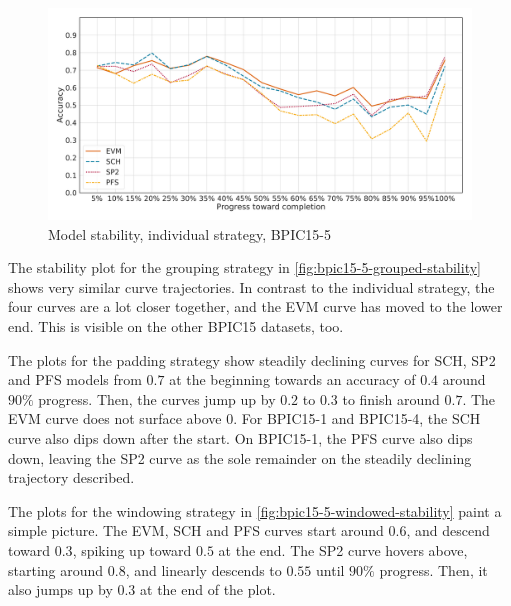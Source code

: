 \begin{figure}[!htb]
    \centering
    \includegraphics[width=\textwidth]{gfx/bpic2015_5/individual_stability.pdf}
    \caption{Model stability, individual strategy, BPIC15-5}
    \label{fig:bpic15-5-individual-stability}
\end{figure}

The stability plot for the grouping strategy in \autoref{fig:bpic15-5-grouped-stability} shows very similar curve trajectories.
In contrast to the individual strategy, the four curves are a lot closer together, and the EVM curve has moved to the lower end.
This is visible on the other BPIC15 datasets, too.

The plots for the padding strategy show steadily declining curves for SCH, SP2 and PFS models from $0.7$ at the beginning towards an accuracy of $0.4$ around $90\%$ progress.
Then, the curves jump up by $0.2$ to $0.3$ to finish around $0.7$.
The EVM curve does not surface above $0$.
For BPIC15-1 and BPIC15-4, the SCH curve also dips down after the start.
On BPIC15-1, the PFS curve also dips down, leaving the SP2 curve as the sole remainder on the steadily declining trajectory described.

The plots for the windowing strategy in \autoref{fig:bpic15-5-windowed-stability} paint a simple picture.
The EVM, SCH and PFS curves start around $0.6$, and descend toward $0.3$, spiking up toward $0.5$ at the end.
The SP2 curve hovers above, starting around $0.8$, and linearly descends to $0.55$ until $90\%$ progress.
Then, it also jumps up by $0.3$ at the end of the plot.

